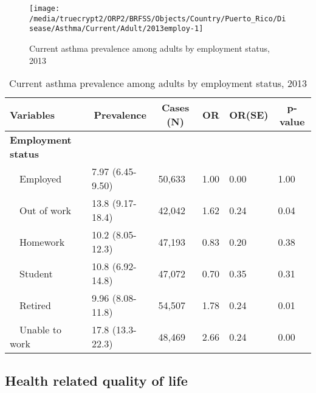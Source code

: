 \begin{figure}[H]
\caption{Current asthma prevalence among adults by employment status, 
         2013}
\label{fig:employ.Asthma.2013}
\begin{knitrout}
\color{fgcolor}

{\centering \texttt{[image: /media/truecrypt2/ORP2/BRFSS/Objects/Country/Puerto\_Rico/Disease/Asthma/Current/Adult/2013employ-1]} 

}



\end{knitrout}
 \end{figure}

\begin{table}[H]
\caption{Current asthma prevalence  among adults by employment status, 2013\label{tab:employ.Asthma.2013}} 
\begin{center}
\begin{tabular}{llllll}
\hline\hline
\multicolumn{1}{l}{Variables}&\multicolumn{1}{c}{Prevalence}&\multicolumn{1}{c}{Cases (N)}&\multicolumn{1}{c}{OR}&\multicolumn{1}{c}{OR(SE)}&\multicolumn{1}{c}{p-value}\tabularnewline
\hline
{\bfseries Employment status}&&&&&\tabularnewline
~~Employed&7.97 (6.45-9.50)&50,633&1.00&0.00&1.00\tabularnewline
~~Out of work&13.8 (9.17-18.4)&42,042&1.62&0.24&0.04\tabularnewline
~~Homework&10.2 (8.05-12.3)&47,193&0.83&0.20&0.38\tabularnewline
~~Student&10.8 (6.92-14.8)&47,072&0.70&0.35&0.31\tabularnewline
~~Retired&9.96 (8.08-11.8)&54,507&1.78&0.24&0.01\tabularnewline
~~Unable to work&17.8 (13.3-22.3)&48,469&2.66&0.24&0.00\tabularnewline
\hline
\end{tabular}\end{center}

\end{table}


 \newpage
\subsection{Health related quality of life}


